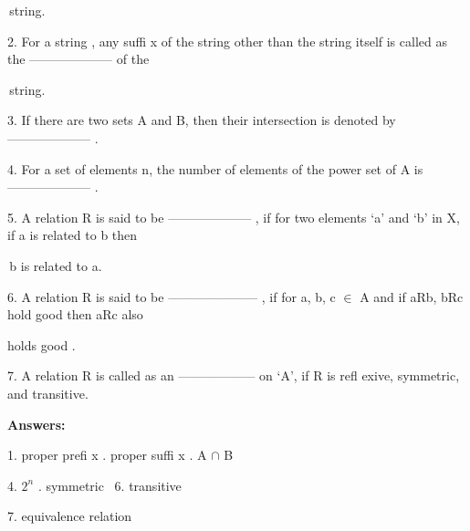 \documentclass[10pt,a4paper]{article}
\begin{document}
\quad\,string.

2. For a string , any suffi x of the string other than the string itself is called as the -------------------- of the

\quad\,string.

3. If there are two sets A and B, then their intersection is denoted by -------------------- .

4. For a set of elements n, the number of elements of the power set of A is -------------------- .

5. A relation R is said to be -------------------- , if for two elements ‘a’ and ‘b’ in X, if a is related to b then

\quad\,b is related to a.

6. A relation R is said to be --------------------- , if for a, b, c $\in$ A and if aRb, bRc hold good then aRc also

holds good .

7. A relation R is called as an ------------------ on ‘A’, if R is refl exive, symmetric, and transitive.

\qquad \tiny 
\qquad

\textsf{\textbf{Answers:}}

\qquad \tiny 

1. proper prefi x \qquad\qquad{}. proper suffi x \qquad\qquad{}. A $\cap$ B

4. $2^{n}$ \qquad\qquad\qquad\qquad\qquad{}. symmetric \qquad\qquad\quad\quad\quad\, 6. transitive

7. equivalence relation
\end{document}
